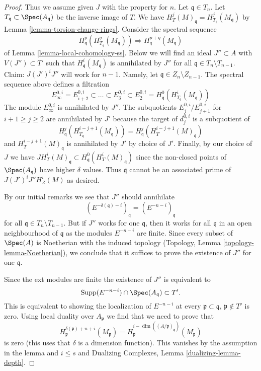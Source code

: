 \begin{proof}
\medskip\noindent
Thus we assume given $J$ with the property for $n$.
Let $\mathfrak q \in T_n$. Let $T_\mathfrak q \subset \Spec(A_\mathfrak q)$
be the inverse image of $T$. We have
$H^j_T(M)_\mathfrak q = H^j_{T_\mathfrak q}(M_\mathfrak q)$
by Lemma \ref{lemma-torsion-change-rings}.
Consider the spectral sequence
$$
H_\mathfrak q^p(H^q_{T_\mathfrak q}(M_\mathfrak q))
\Rightarrow
H^{p + q}_\mathfrak q(M_\mathfrak q)
$$
of Lemma \ref{lemma-local-cohomology-ss}.
Below we will find an ideal $J'' \subset A$ with $V(J'') \subset T'$
such that $H^i_\mathfrak q(M_\mathfrak q)$ is annihilated by $J''$ for all
$\mathfrak q \in T_n \setminus T_{n - 1}$.
Claim: $J (J')^i J''$ will work for $n - 1$.
Namely, let $\mathfrak q \in Z_n \setminus Z_{n - 1}$.
The spectral sequence above defines a filtration
$$
E_\infty^{0, i} = E_{i + 2}^{0, i} \subset \ldots \subset E_3^{0, i} \subset
E_2^{0, i} = H^0_\mathfrak q(H^i_{T_\mathfrak q}(M_\mathfrak q))
$$
The module $E_\infty^{0, i}$ is annihilated by $J''$.
The subquotients $E_j^{0, i}/E_{j + 1}^{0, i}$ for $i + 1 \geq j \geq 2$
are annihilated by $J'$ because the target of $d_j^{0, i}$
is a subquotient of
$$
H^j_\mathfrak q(H^{i - j + 1}_{T_\mathfrak q}(M_\mathfrak q)) =
H^j_\mathfrak q(H^{i - j + 1}_T(M)_\mathfrak q)
$$
and $H^{i - j + 1}_T(M)_\mathfrak q$ is annihilated by $J'$ by choice of $J'$.
Finally, by our choice of $J$ we have
$J H^i_T(M)_\mathfrak q \subset H^0_\mathfrak q(H^i_T(M)_\mathfrak q)$
since the non-closed points of $\Spec(A_\mathfrak q)$ have higher
$\delta$ values. Thus $\mathfrak q$ cannot be an associated prime of
$J(J')^iJ'' H^i_Z(M)$ as desired.

\medskip\noindent
By our initial remarks we see that $J''$ should annihilate
$$
(E^{-\delta(\mathfrak q) - i})_\mathfrak q =
(E^{-n - i})_\mathfrak q
$$
for all $\mathfrak q \in T_n \setminus T_{n - 1}$.
But if $J''$ works for one $\mathfrak q$, then it works for all
$\mathfrak q$ in an open neighbourhood of $\mathfrak q$
as the modules $E^{-n - i}$ are finite.
Since every subset of $\Spec(A)$ is Noetherian with the induced
topology (Topology, Lemma \ref{topology-lemma-Noetherian}),
we conclude that it suffices
to prove the existence of $J''$ for one $\mathfrak q$.

\medskip\noindent
Since the ext modules are finite the existence of $J''$ is
equivalent to
$$
\text{Supp}(E^{-n - i}) \cap \Spec(A_\mathfrak q) \subset T'.
$$
This is equivalent to showing the localization of $E^{-n - i}$ at every
$\mathfrak p \subset \mathfrak q$, $\mathfrak p \not \in T'$
is zero. Using local duality over $A_\mathfrak p$ we find that we need
to prove that
$$
H^{\delta(\mathfrak p) + n + i}_\mathfrak p(M_\mathfrak p) =
H^{i - \dim((A/\mathfrak p)_\mathfrak q)}_\mathfrak p(M_\mathfrak p)
$$
is zero (this uses that $\delta$ is a dimension function).
This vanishes by the assumption in the lemma and $i \leq s$ and
Dualizing Complexes, Lemma \ref{dualizing-lemma-depth}.


\end{proof}
